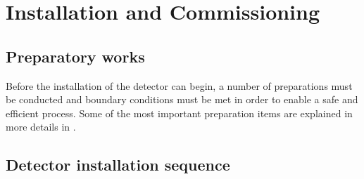 \section{Installation and Commissioning}
\label{sec:detectors-fd-alt-install}

\subsection{Preparatory works}

Before the installation of the detector can begin, a number of
preparations must be conducted and boundary conditions must be met   in
order to enable a safe and efficient process.
Some of the most important
preparation items are explained in more details in \anxlbnob. 

\subsection{Detector installation sequence}


